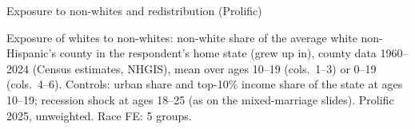 \documentclass[aspectratio=169]{beamer}
\begin{document}
\begin{frame}{Exposure to non-whites and redistribution (Prolific)}

\begin{table}
    \centering
    \scalebox{0.85}{\parbox{\linewidth}{\centering\tiny\setlength{\tabcolsep}{4pt}\renewcommand{\arraystretch}{0.72}
    }}
\end{table}
\vspace{-0.6em}
{\tiny Exposure of whites to non-whites: non-white share of the average white non-Hispanic's county in the respondent's home state (grew up in), county data 1960--2024 (Census estimates, NHGIS), mean over ages 10--19 (cols.\ 1--3) or 0--19 (cols.\ 4--6). Controls: urban share and top-10\% income share of the state at ages 10--19; recession shock at ages 18--25 (as on the mixed-marriage slides). Prolific 2025, unweighted. Race FE: 5 groups.\par}

\end{frame}

%
%
\end{document}
